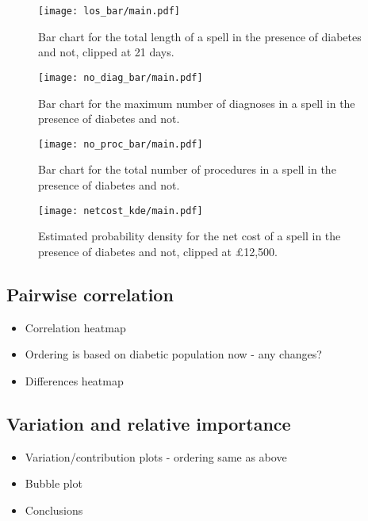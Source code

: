 \begin{figure}[htbp]
    \texttt{[image: los\_bar/main.pdf]}
    \caption{Bar chart for the total length of a spell in the presence of
        diabetes and not, clipped at 21 days.}%
    \label{fig:diabetes_los_bar}
\end{figure}

\begin{figure}[htbp]
    \centering
    \texttt{[image: no\_diag\_bar/main.pdf]}
    \caption{Bar chart for the maximum number of diagnoses in a spell in the
        presence of diabetes and not.}%
    \label{fig:diabetes_no_diag_bar}
\end{figure}

\begin{figure}[htbp]
    \centering
    \texttt{[image: no\_proc\_bar/main.pdf]}
    \caption{Bar chart for the total number of procedures in a spell in the
        presence of diabetes and not.}%
    \label{fig:diabetes_no_proc_bar}
\end{figure}

\begin{figure}[htbp]
    \centering
    \texttt{[image: netcost\_kde/main.pdf]}
    \caption{Estimated probability density for the net cost of a spell in the
        presence of diabetes and not, clipped at \pounds12,500.}%
    \label{fig:diabetes_netcost_kde}
\end{figure}


\subsection{Pairwise correlation}\label{subsec:diabetes_correlation}

\begin{itemize}
    \item Correlation heatmap
    \item Ordering is based on diabetic population now \-- any changes?
    \item Differences heatmap
\end{itemize}


\subsection{Variation and relative importance}\label{subsec:diabetes_variation}

\begin{itemize}
    \item Variation/contribution plots \-- ordering same as above
    \item Bubble plot
    \item Conclusions
\end{itemize}
